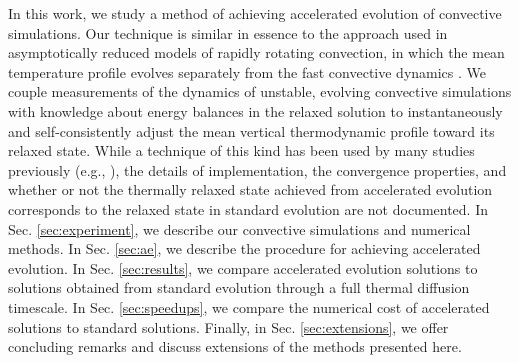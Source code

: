 In this work, we study a method of achieving accelerated evolution of
convective simulations. 
Our technique is similar in essence to the approach used in asymptotically 
reduced models of rapidly rotating convection, in which the
mean temperature profile evolves separately from the
fast convective dynamics \cite{julien&all1998, sprague&all2006}. 
We couple measurements of the dynamics of unstable, evolving
convective simulations with knowledge about energy balances in the relaxed solution
to instantaneously and self-consistently adjust the mean vertical thermodynamic 
profile toward its relaxed state. 
While a technique of this kind has been used by many studies previously 
(e.g., \cite{hurlburt&all1986}),
the details of implementation, the convergence properties, and whether or not the
thermally relaxed state achieved from 
accelerated evolution corresponds to the relaxed state in standard evolution 
are not documented.
In Sec. \ref{sec:experiment}, we describe our convective simulations and
numerical methods. In Sec. \ref{sec:ae}, we describe the procedure for 
achieving accelerated evolution. In
Sec. \ref{sec:results}, we compare accelerated evolution solutions
to solutions obtained from standard evolution through a full thermal diffusion timescale. 
In Sec. \ref{sec:speedups}, we compare the numerical cost of accelerated
solutions to standard solutions.
Finally,
in Sec. \ref{sec:extensions}, we offer concluding remarks and
discuss extensions of the methods presented here.



